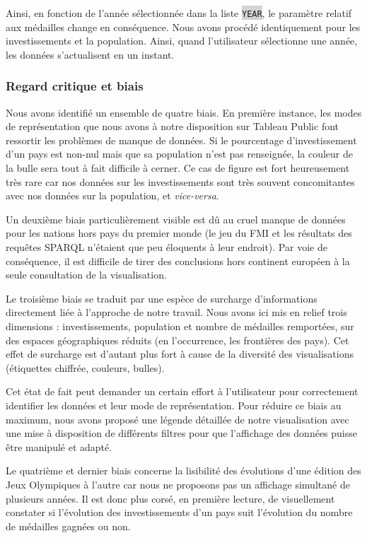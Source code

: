 \documentclass[hidelinks, 12pt]{report}
\newcommand{\code}[1]{\colorbox{LightGray}{\texttt{#1}}}
\begin{document}
Ainsi, en fonction de l'année sélectionnée dans la liste \code{YEAR}, le paramètre relatif aux médailles change en conséquence. Nous avons procédé identiquement pour les investissements et la population. Ainsi, quand l'utilisateur sélectionne une année, les données s'actualisent en un instant.

\subsubsection{Regard critique et biais}

Nous avons identifié un ensemble de quatre biais. En première instance, les modes de représentation que nous avons à notre disposition sur Tableau Public font ressortir les problèmes de manque de données. Si le pourcentage d'investissement d'un pays est non-nul mais que sa population n'est pas renseignée, la couleur de la bulle sera tout à fait difficile à cerner. Ce cas de figure est fort heureusement très rare car nos données sur les investissements sont très souvent concomitantes avec nos données sur la population, et \textit{vice-versa}.

Un deuxième biais particulièrement visible est dû au cruel manque de données pour les nations hors pays du premier monde (le jeu du FMI et les résultats des requêtes SPARQL n'étaient que peu éloquents à leur endroit). Par voie de conséquence, il est difficile de tirer des conclusions hors continent européen à la seule consultation de la visualisation.

Le troisième biais se traduit par une espèce de surcharge d'informations directement liée à l'approche de notre travail. Nous avons ici mis en relief trois dimensions : investissements, population et nombre de médailles remportées, sur des espaces géographiques réduits (en l'occurrence, les frontières des pays). Cet effet de surcharge est d'autant plus fort à cause de la diversité des visualisations (étiquettes chiffrée, couleurs, bulles).

Cet état de fait peut demander un certain effort à l'utilisateur pour correctement identifier les données et leur mode de représentation. Pour réduire ce biais au maximum, nous avons proposé une légende détaillée de notre visualisation avec une mise à disposition de différents filtres pour que l'affichage des données puisse être manipulé et adapté.

Le quatrième et dernier biais concerne la lisibilité des évolutions d'une édition des Jeux Olympiques à l'autre car nous ne proposons pas un affichage simultané de plusieurs années. Il est donc plus corsé, en première lecture, de visuellement constater si l'évolution des investissements d'un pays suit l'évolution du nombre de médailles gagnées ou non.
\end{document}
